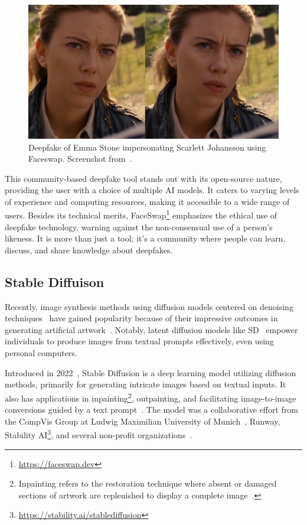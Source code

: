 \begin{figure}[htpb]
	\centering
	\includegraphics[scale=0.32]{figures/emma-stone-faceswap}
	\caption{Deepfake of Emma Stone impersonating Scarlett Johansson using
		Faceswap. Screenshot from~\cite{emma-stone-faceswap}.}
\end{figure}

This community-based deepfake tool stands out with its open-source nature,
providing the user with a choice of multiple \ac{AI} models. It caters to
varying levels of experience and computing resources, making it accessible
to a wide range of users. Besides its technical merits,
FaceSwap\footnote{\url{https://faceswap.dev}} emphasizes the ethical use
of deepfake technology, warning against the non-consensual use of a person's
likeness. It is more than just a tool; it's a community where people can
learn, discuss, and share knowledge about deepfakes.

\subsection{Stable Diffuison}\label{sec:stable-diffusion}
Recently, image synthesis methods using diffusion models centered on denoising
techniques~\cite{ho2020denoising} have gained popularity because of their impressive
outcomes in generating artificial artwork~\cite{10.1145/3588015.3589842}.
Notably, latent diffusion models like \ac{SD}~\cite{rombach2022highresolution}
empower individuals to produce images from textual prompts effectively,
even using personal computers.

Introduced in 2022~\cite{rombach2022highresolution}, Stable Diffusion is a deep learning
model utilizing diffusion methods, primarily for generating intricate images based
on textual inputs. It also has applications in inpainting\footnote{Inpainting refers
	to the restoration technique where absent or damaged sections of artwork are
	replenished to display a complete image~\cite{enwiki:1164523541}.},
outpainting, and facilitating image-to-image conversions guided by a text
prompt~\cite{sd-hugging-face}. The model was a collaborative effort from the CompVis Group
at Ludwig Maximilian University of Munich~\cite{enwiki:1169859793}, Runway,
Stability AI\footnote{\url{https://stability.ai/stablediffusion}}, and
several non-profit organizations~\cite{sifted-2020,sd-lmu,stabilityai}.

